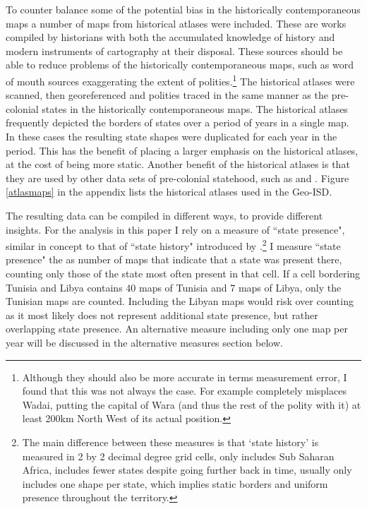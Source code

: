 \documentclass[12pt]{article}
\begin{document}

To counter balance some of the potential bias in the historically
contemporaneous maps a number of maps from historical atlases were included.
These are works compiled by historians with both the accumulated knowledge of
history and modern instruments of cartography at their disposal. These sources
should be able to reduce problems of the historically contemporaneous maps, such
as word of mouth sources exaggerating the extent of polities.\footnote{Although
	they should also be more accurate in terms measurement error, I found
	that this was not always the case. For example \citep{Kasule1998}
completely misplaces Wadai, putting the capital of Wara (and thus the rest of
the polity with it) at least 200km North West of its actual position.} The
historical atlases were scanned, then georeferenced and polities traced in the
same manner as the pre-colonial states in the historically contemporaneous maps.
The historical atlases frequently depicted the borders of states over a period
of years in a single map. In these cases the resulting state shapes were
duplicated for each year in the period. This has the benefit of placing a larger
emphasis on the historical atlases, at the cost of being more static. Another
benefit of the historical atlases is that they are used by other data sets of
pre-colonial statehood, such as \citet{Paine2019} and
\citet{Depetris-Chauvin2016}. Figure \ref{atlasmaps} in the appendix lists the
historical atlases used in the Geo-ISD.

The resulting data can be compiled in different ways, to provide different
insights. For the analysis in this paper I rely on a measure of ``state
presence", similar in concept to that of ``state history" introduced by
\citet{Depetris-Chauvin2016}.\footnote{The main difference between these
	measures is that `state history' is measured in 2 by 2 decimal degree
	grid cells, only includes Sub Saharan Africa, includes fewer states
	despite going further back in time, usually only includes one shape per
state, which implies static borders and uniform presence throughout the
territory.} I measure ``state presence" the as number of maps that indicate that
a state was present there, counting only those of the state most often present
in that cell. If a cell bordering Tunisia and Libya contains 40 maps of
Tunisia and 7 maps of Libya, only the Tunisian maps are counted. Including the
Libyan maps would risk over counting as it most likely does not represent
additional state presence, but rather overlapping state presence. An alternative
measure including only one map per year will be discussed in the alternative
measures section below.
\end{document}

